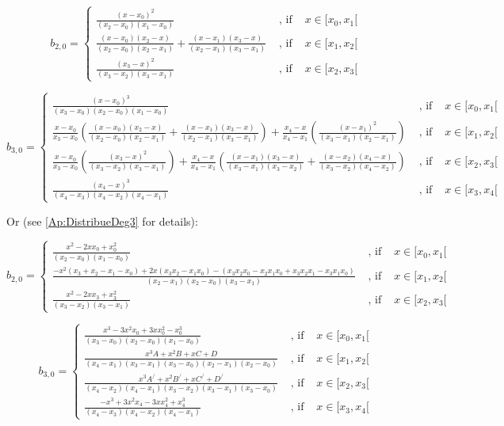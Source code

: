 \documentclass[paper=a4, fontsize=11pt]{scrartcl}
\numberwithin{equation}{section}		%
\numberwithin{figure}{section}			%
\numberwithin{table}{section}				%
\begin{document}
$$
b_{2,0} =
\left\{
\begin{array}{lll}
\frac{(x-x_0)^2}{(x_2-x_0)(x_1-x_0)} & \text{ ,  if  } & x \in [x_0,x_1[\\
\frac{(x-x_0)(x_2-x)}{(x_2-x_0)(x_2-x_1)} + \frac{(x-x_1)(x_3-x)}{(x_2-x_1)(x_3-x_1)} & \text{ ,  if  } & x \in [x_1,x_2[\\
\frac{(x_3-x)^2}{(x_3-x_2)(x_3-x_1)} & \text{ ,  if  } & x \in [x_2,x_3[
\end{array}
\right.
$$

$$
b_{3,0} =
\left\{
\begin{array}{lll}
\frac{(x-x_0)^3}{(x_3-x_0)(x_2-x_0)(x_1-x_0)} & \text{ ,  if  } & x \in [x_0,x_1[\\
\frac{x-x_0}{x_3-x_0}\left(\frac{(x-x_0)(x_2-x)}{(x_2-x_0)(x_2-x_1)} + \frac{(x-x_1)(x_3-x)}{(x_2-x_1)(x_3-x_1)}\right) + \frac{x_4-x}{x_4-x_1}\left(\frac{(x-x_1)^2}{(x_3-x_1)(x_2-x_1)}\right) & \text{ ,  if  } & x \in [x_1,x_2[\\
\frac{x-x_0}{x_3-x_0}\left(\frac{(x_3-x)^2}{(x_3-x_2)(x_3-x_1)}\right) + \frac{x_4-x}{x_4-x_1}\left(\frac{(x-x_1)(x_3-x)}{(x_3-x_1)(x_3-x_2)} + \frac{(x-x_2)(x_4-x)}{(x_3-x_2)(x_4-x_2)}\right)& \text{ ,  if  } & x \in [x_2,x_3[\\
\frac{(x_4-x)^3}{(x_4-x_3)(x_4-x_2)(x_4-x_1)} & \text{ ,  if  } & x \in [x_3,x_4[
\end{array}
\right.
$$

Or (see \ref{Ap:DistribueDeg3} for details):

$$
b_{2,0} =
\left\{
\begin{array}{lll}
\frac{x^2-2xx_0+x_0^2}{(x_2-x_0)(x_1-x_0)} & \text{ ,  if  } & x \in [x_0,x_1[\\
\frac{-x^2(x_3+x_2-x_1-x_0) + 2x(x_3x_2-x_1x_0) - (x_3x_2x_0 - x_2x_1x_0 + x_3x_2x_1 - x_3x_1x_0)}{ (x_2-x_1)(x_2-x_0)(x_3-x_1)} & \text{ ,  if  } & x \in [x_1,x_2[\\
\frac{x^2-2xx_3+x_3^2}{(x_3-x_2)(x_3-x_1)} & \text{ ,  if  } & x \in [x_2,x_3[
\end{array}
\right.
$$


$$
b_{3,0} =
\left\{
\begin{array}{lll}
\frac{x^3 - 3x^2x_0 + 3xx_0^2 - x_0^3}{(x_3-x_0)(x_2-x_0)(x_1-x_0)} & \text{ ,  if  } & x \in [x_0,x_1[\\
\frac{x^3A + x^2B + xC + D}{(x_4-x_1)(x_3-x_1)(x_3-x_0)(x_2-x_1)(x_2-x_0)} & \text{ ,  if  } & x \in [x_1,x_2[\\
\frac{x^3A^/ + x^2B^/ + xC^/ + D^/}{(x_4-x_2)(x_4-x_1)(x_3-x_2)(x_3-x_1)(x_3-x_0)} & \text{ ,  if  } & x \in [x_2,x_3[\\
\frac{-x^3 + 3x^2x_4 - 3xx_4^2 + x_4^3}{(x_4-x_3)(x_4-x_2)(x_4-x_1)} & \text{ ,  if  } & x \in [x_3,x_4[
\end{array}
\right.
$$
\end{document}
